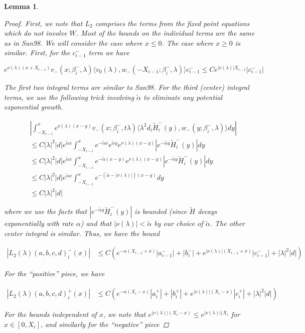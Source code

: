 \documentclass[12pt]{article}
\newtheorem{lemma}{Lemma}
\begin{document}
\begin{lemma}
\begin{proof}
First, we note that $L_2$ comprises the terms from the fixed point equations which do not involve $W$. Most of the bounds on the individual terms are the same as in San98. We will consider the case where $x \leq 0$. The case where $x \geq 0$ is similar. First, for the $c_{i-1}^-$ term we have

\[
e^{\nu(\lambda)(x+X_{i-1})} v_-(x; \beta_i^-, \lambda) \langle v_0(\lambda), w_-(-X_{i-1}; \beta_i^-, \lambda) \rangle c_{i-1}^- \leq C e^{|\nu(\lambda)| X_{i-1} }|c_{i-1}^-|
\]

The first two integral terms are similar to San98. For the third (center) integral terms, we use the following trick involving $\tilde{\alpha}$ to eliminate any potential exponential growth.

\begin{align*}
&\left| \int_{-X_{i-1}}^x 
e^{\nu(\lambda)(x-y)} v_-(x; \beta_i^-,t \lambda) \langle \lambda^2 d_i \tilde{H}_i^-(y), w_-(y; \beta_i^-, \lambda) \rangle dy \right| \\
&\leq C |\lambda|^2 |d| e^{\tilde{\alpha}x} \int_{-X_{i-1}}^x e^{-\tilde{\alpha}x} e^{\tilde{\alpha}y} e^{\nu(\lambda)(x-y)} |e^{-\tilde{\alpha}y}\tilde{H}_i^-(y)|dy \\
&\leq C |\lambda|^2 |d| e^{\tilde{\alpha}x} \int_{-X_{i-1}}^x e^{-\tilde{\alpha}(x-y)} e^{\nu(\lambda)(x-y)} |e^{-\tilde{\alpha}y}\tilde{H}_i^-(y)| dy \\
&\leq C |\lambda|^2 |d| e^{\tilde{\alpha}x} \int_{-X_{i-1}}^x e^{-(\tilde{\alpha} - |\nu(\lambda)|)(x-y)} dy \\
&\leq C |\lambda|^2 |d|
\end{align*}

where we use the facts that $|e^{-\tilde{\alpha}y}\tilde{H}_i^-(y)|$ is bounded (since $\tilde{H}$ decays exponentially with rate $\alpha$) and that $|\nu(\lambda)| < \tilde{\alpha}$ by our choice of $\tilde{\alpha}$. The other center integral is similar. Thus, we have the bound 

\begin{align*}
|L_2(\lambda)(a,b,c,d)_i^-(x)| &\leq C (e^{-\alpha(X_{i-1} + x)}|a_{i-1}^-| + |b_i^-| + e^{|\nu(\lambda)|(X_{i-1} + x)} |c_{i-1}^-| + |\lambda|^2 |d| )
\end{align*}

For the ``positive'' piece, we have

\begin{align*}
|L_2(\lambda)(a,b,c,d)_i^+(x)| &\leq C (e^{-\alpha(X_i - x)}|a_i^+| + |b_i^+| + e^{|\nu(\lambda)|(X_i - x)} |c_i^+| + |\lambda|^2 |d| ) 
\end{align*}

For the bounds independent of $x$, we note that $e^{|\nu(\lambda)|(X_i - x)} \leq e^{|\nu(\lambda)|(X_i}$ for $x \in [0, X_i]$, and similarly for the ``negative'' piece

\end{proof}
\end{lemma}
\end{document}
